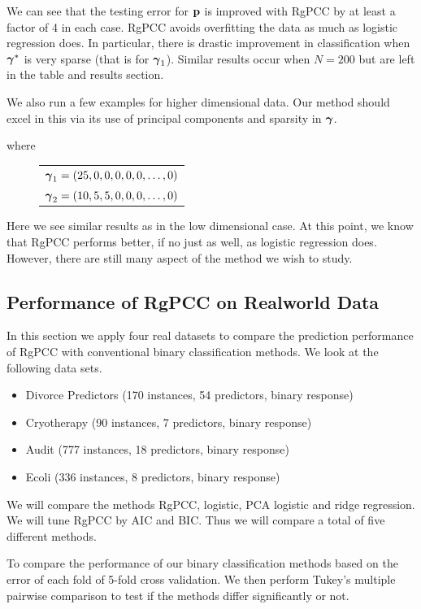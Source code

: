 \documentclass[main.tex]{subfiles}
\begin{document}
We can see that the testing error for $\mathbf{p}$ is improved with RgPCC by at least a factor of 4 in each case. RgPCC avoids overfitting the data as much as logistic regression does. In particular, there is drastic improvement in classification when $\boldsymbol \gamma^*$ is very sparse (that is for $\boldsymbol \gamma_1$). Similar results occur when $N = 200$ but are left in the table and results section.

We also run a few examples for higher dimensional data. Our method should excel in this via its use of principal components and sparsity in $\boldsymbol \gamma$.

where

\begin{figure}[H]
	\begin{tabular}{l}
		$\boldsymbol \gamma_1 = (25, 0, 0, 0, 0, 0, \ldots , 0)$ \\
		$\boldsymbol \gamma_2 = (10, 5, 5, 0, 0, 0, \ldots , 0)$
	\end{tabular}
\end{figure}

Here we see similar results as in the low dimensional case. At this point, we know that RgPCC performs better, if no just as well, as logistic regression does. However, there are still many aspect of the method we wish to study.

\subsection{Performance of RgPCC on Realworld Data}

In this section we apply four real datasets to compare the prediction performance of RgPCC with conventional binary classification methods. We look at the following data sets.
\begin{itemize}
    \item Divorce Predictors (170 instances, 54 predictors, binary response)
    \item Cryotherapy (90 instances, 7 predictors, binary response)
    \item Audit (777 instances, 18 predictors, binary response)
    \item Ecoli (336 instances, 8 predictors, binary response)
\end{itemize}

We will compare the methods RgPCC, logistic, PCA logistic and ridge regression. We will tune RgPCC by AIC and BIC. Thus we will compare a total of five different methods. 

To compare the performance of our binary classification methods based on the error of each fold of 5-fold cross validation. We then perform Tukey's multiple pairwise comparison to test if the methods differ significantly or not.
\end{document}
